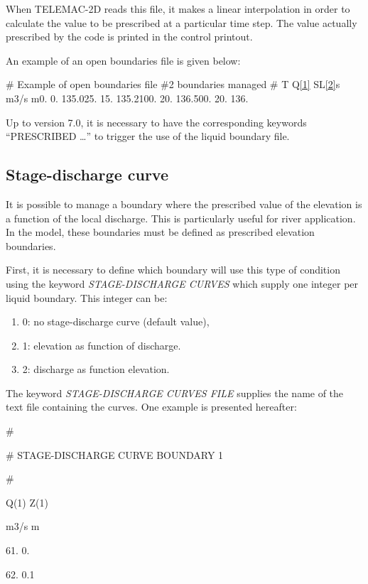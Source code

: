  When TELEMAC-2D reads this file, it makes a linear interpolation in order to calculate the value to be prescribed at a particular time step. The value actually prescribed by the code is printed in the control printout.

 An example of an open boundaries file is given below:

 \#  Example of open boundaries file \#2 boundaries managed \# T  Q\eqref{1} SL\eqref{2}s  m3/s m0.  0. 135.025. 15. 135.2100. 20. 136.500. 20. 136.


 Up to version 7.0, it is necessary to have the corresponding keywords ``PRESCRIBED {\dots}'' to trigger the use of the liquid boundary file.


\subsection{  Stage-discharge curve}

 It is possible to manage a boundary where the prescribed value of the elevation is a function of the local discharge. This is particularly useful for river application. In the model, these boundaries must be defined as prescribed elevation boundaries.

 First, it is necessary to define which boundary will use this type of condition using the keyword \textit{STAGE-DISCHARGE CURVES} which supply one integer per liquid boundary. This integer can be:

\begin{enumerate}
\item  0: no stage-discharge curve (default value),

\item  1: elevation as function of discharge.

\item  2: discharge as function elevation.
\end{enumerate}

 The keyword \textit{STAGE-DISCHARGE CURVES FILE} supplies the name of the text file containing the curves. One example is presented hereafter:

 \#

 \#  STAGE-DISCHARGE CURVE BOUNDARY 1

 \#

 Q(1)     Z(1)

 m3/s      m

 61.       0.

 62.       0.1

